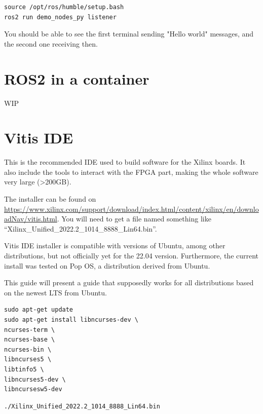 \documentclass[10pt]{article}
\begin{document}
\begin{tcolorbox}
\begin{verbatim}
source /opt/ros/humble/setup.bash
ros2 run demo_nodes_py listener
\end{verbatim}
\end{tcolorbox}


You should be able to see the first terminal sending "Hello world" messages, and the second one receiving then.

\section{ROS2 in a container}
\label{sec:ros2-container}
WIP


\section{Vitis IDE}
\label{sec:vitis-ide}
This is the recommended IDE used to build software for the Xilinx boards.
It also include the tools to interact with the FPGA part, making the whole
software very large (>200GB).

The installer can be found on \href{Xilinx download page}{https://www.xilinx.com/support/download/index.html/content/xilinx/en/downloadNav/vitis.html}. You will need to get
a file named something like ``Xilinx\_Unified\_2022.2\_1014\_8888\_Lin64.bin''.

Vitis IDE installer is compatible with versions of Ubuntu, among other distributions,
but not officially yet for the 22.04 version.
Furthermore, the current install was tested on Pop OS, a distribution derived from Ubuntu.

This guide will present a guide that supposedly works for all distributions based on the newest
LTS from Ubuntu.

\begin{tcolorbox}
\begin{verbatim}
sudo apt-get update
sudo apt-get install libncurses-dev \
ncurses-term \
ncurses-base \
ncurses-bin \
libncurses5 \
libtinfo5 \
libncurses5-dev \
libncursesw5-dev
\end{verbatim}
\end{tcolorbox}

\begin{tcolorbox}
\begin{verbatim}
./Xilinx_Unified_2022.2_1014_8888_Lin64.bin
\end{verbatim}
\end{tcolorbox}
\end{document}
